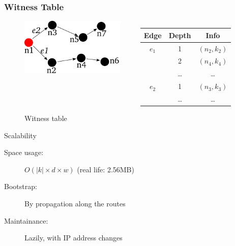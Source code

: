 \documentclass{beamer}
\begin{document}

\begin{frame}

  \frametitle{Witness Table}

  \begin{figure}
    \begin{columns}
      \begin{column}{5cm}
	\includegraphics[width=5cm]{./pictures/witness_table} 
      \end{column}
      \begin{column}{5cm}
	\begin{center}
	\begin{tabular}{|c|c|c|}
	  \hline
	  Edge     &  Depth     &  Info \\
	  \hline
	  \hline
	  $e_1$    &  1         &  $(n_2, k_2)$ \\
	           &  2         &  $(n_4, k_4)$ \\
	           &  \ldots    &  \ldots       \\
	  \hline
	  \hline
	  $e_2$    &  1         &  $(n_3, k_3)$ \\
	           & \ldots     &  \ldots       \\
	  \hline
	\end{tabular}
	\end{center}
      \end{column}
    \end{columns}
    \caption{Witness table}
  \end{figure}

  \begin{block}{Scalability}
    \begin{description}
    \item[Space usage:] $O( |k| \times d \times w )$ (real life: 2.56MB)
    \item[Bootstrap:] By propagation along the routes
    \item[Maintainance:] Lazily, with IP address changes
    \end{description}
  \end{block}

\end{frame}
\end{document}
